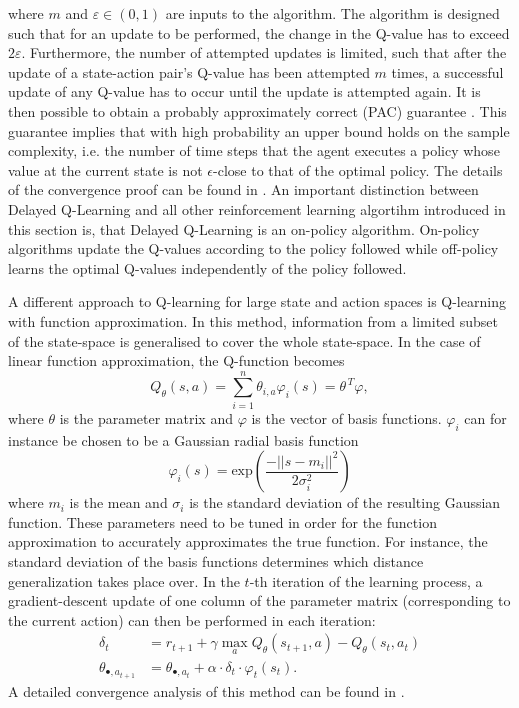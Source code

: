 \documentclass[../main.tex]{subfiles}
\begin{document}
where $m$ and $\varepsilon \in (0,1)$ are inputs to the algorithm. The algorithm is designed such that for an update to be performed, the change in the Q-value has to exceed $2\varepsilon$. Furthermore, the number of attempted updates is limited, such that after the update of a state-action pair's Q-value has been attempted $m$ times, a successful update of any Q-value has to occur until the update is attempted again. It is then possible to obtain a probably approximately correct (PAC) guarantee \cite{strehl2006pac}. This guarantee implies that with high probability an upper bound holds on the sample complexity, i.e. the number of time steps that the agent executes a policy whose value at the current state is not $\epsilon$-close to that of the optimal policy. The details of the convergence proof can be found in \cite{strehl2006pac}. An important distinction between Delayed Q-Learning and all other reinforcement learning algortihm introduced in this section is, that Delayed Q-Learning is an on-policy algorithm. On-policy algorithms update the Q-values according to the policy followed while off-policy learns the optimal Q-values independently of the policy followed. \par
A different approach to Q-learning for large state and action spaces is Q-learning with function approximation. In this method, information from a limited subset of the state-space is generalised to cover the whole state-space.  In the case of linear function approximation, the Q-function becomes
\begin{equation}
Q_\theta(s,a) = \sum_{i=1}^n \theta_{i,a}\varphi_i(s) = {\theta}^{\,T} \varphi,
\end{equation}
where $\theta$ is the parameter matrix and $\varphi$ is the vector of basis functions. $\varphi_i$ can for instance be chosen to be a Gaussian radial basis function
\begin{equation}
\varphi_i(s) = \text{exp}\left(\dfrac{-||s-m_i||^2}{2\sigma_i^2}\right)
\end{equation}
where $m_i$ is the mean and $\sigma_i$ is the standard deviation of the resulting Gaussian function. These parameters need to be tuned in order for the function approximation to accurately approximates the true function. For instance, the standard deviation of the basis functions determines which distance generalization takes place over. In the $t$-th iteration of the learning process, a gradient-descent update of one column of the parameter matrix (corresponding to the current action) can then be performed in each iteration:
\begin{align}
\delta_t &= r_{t+1} + \gamma \max_a Q_\theta(s_{t+1},a) - Q_\theta(s_{t},a_t)\\
\theta_{\bullet,a_{t+1}} &= \theta_{\bullet,a_{t}} + \alpha \cdot \delta_t  \cdot \varphi_t(s_t).
\end{align}
A detailed convergence analysis of this method can be found in \cite{tsitsiklis1997analysis}.
\end{document}
